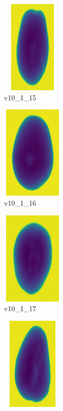 \documentclass[11pt]{article}
\begin{document}
\begin{figure}
     
    \begin{subfigure}[b]{0.15\textwidth}
         \centering
         \includegraphics[width=3cm, height=4.5cm]{images/kartofler/v10_1_15_cut.png}
         \caption{v10\_1\_15}
         \label{fig:y equals x}
     \end{subfigure}
     \hfill
     \begin{subfigure}[b]{0.15\textwidth}
         \centering
         \includegraphics[width=3cm, height=4.5cm]{images/kartofler/v10_1_16_cut.png}
        \caption{v10\_1\_16}
         \label{fig:three sin x}
     \end{subfigure}
     \hfill
     \begin{subfigure}[b]{0.15\textwidth}
         \centering
         \includegraphics[width=3cm, height=4.5cm]{images/kartofler/v10_1_17_cut.png}
        \caption{v10\_1\_17}
         \label{fig:five over x}
     \end{subfigure}
     \hfill
    \begin{subfigure}[b]{0.15\textwidth}
         \centering
         \includegraphics[width=3cm, height=4.5cm]{images/kartofler/v10_1_18_cut.png}

\end{subfigure}
\end{figure}
\end{document}
